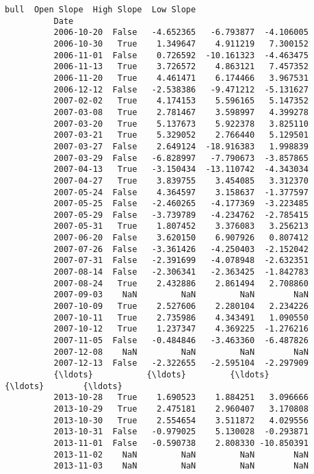 \documentclass[11pt]{article}
\begin{document}
\begin{Verbatim}[commandchars=\\\{\}]
                       bull  Open Slope  High Slope  Low Slope  
          Date                                                  
          2006-10-20  False   -4.652365   -6.793877  -4.106005  
          2006-10-30   True    1.349647    4.911219   7.300152  
          2006-11-01  False    0.726592  -10.161323  -4.463475  
          2006-11-13   True    3.726572    4.863121   7.457352  
          2006-11-20   True    4.461471    6.174466   3.967531  
          2006-12-12  False   -2.538386   -9.471212  -5.131627  
          2007-02-02   True    4.174153    5.596165   5.147352  
          2007-03-08   True    2.781467    3.598997   4.399278  
          2007-03-20   True    5.137673    5.922378   3.825110  
          2007-03-21   True    5.329052    2.766440   5.129501  
          2007-03-27  False    2.649124  -18.916383   1.998839  
          2007-03-29  False   -6.828997   -7.790673  -3.857865  
          2007-04-13   True   -3.150434  -13.110742  -4.343034  
          2007-04-27   True    3.839755    3.454085   3.312370  
          2007-05-24  False    4.364597    3.158637  -1.377597  
          2007-05-25  False   -2.460265   -4.177369  -3.223485  
          2007-05-29  False   -3.739789   -4.234762  -2.785415  
          2007-05-31   True    1.807452    3.376083   3.256213  
          2007-06-20  False    3.620150    6.907926   0.807412  
          2007-07-26  False   -3.361426   -4.250403  -2.152042  
          2007-07-31  False   -2.391699   -4.078948  -2.632351  
          2007-08-14  False   -2.306341   -2.363425  -1.842783  
          2007-08-24   True    2.432886    2.861494   2.708860  
          2007-09-03    NaN         NaN         NaN        NaN  
          2007-10-09   True    2.527606    2.280104   2.234226  
          2007-10-11   True    2.735986    4.343491   1.090550  
          2007-10-12   True    1.237347    4.369225  -1.276216  
          2007-11-05  False   -0.484846   -3.463360  -6.487826  
          2007-12-08    NaN         NaN         NaN        NaN  
          2007-12-13  False   -2.322655   -2.595104  -2.297909  
          {\ldots}           {\ldots}         {\ldots}         {\ldots}        {\ldots}  
          2013-10-28   True    1.690523    1.884251   3.096666  
          2013-10-29   True    2.475181    2.960407   3.170808  
          2013-10-30   True    2.554654    3.511872   4.029556  
          2013-10-31  False   -0.979025    5.130028  -0.293871  
          2013-11-01  False   -0.590738    2.808330 -10.850391  
          2013-11-02    NaN         NaN         NaN        NaN  
          2013-11-03    NaN         NaN         NaN        NaN  

\end{Verbatim}
\end{document}
